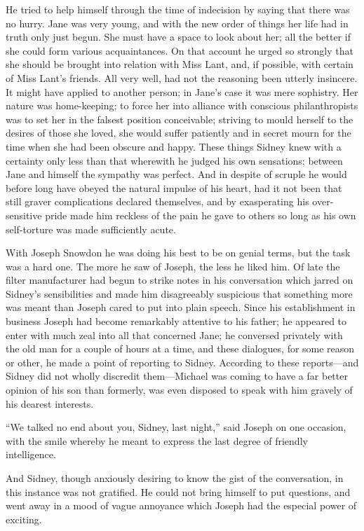He tried to help himself through the time of indecision by saying that
there was no hurry. Jane was very young, and with the new order of
things her life had in truth only just begun. She must have a space to
look about her; all the better if she could form various acquaintances.
On that account he urged so strongly that she should be brought into
relation with Miss Lant, and, if possible, with certain of Miss Lant's
friends. All very well, had not the reasoning been utterly insincere. It
might have applied to another person; in Jane's case it was mere
sophistry. Her nature was home-keeping; to force her into alliance with
conscious {}philanthropists was to set her in the falsest position
conceivable; striving to mould herself to the desires of those she
loved, she would suffer patiently and in secret mourn for the time when
she had been obscure and happy. These things Sidney knew with a
certainty only less than that wherewith he judged his own sensations;
between Jane and himself the sympathy was perfect. And in despite of
scruple he would before long have obeyed the natural impulse of his
heart, had it not been that still graver complications declared
themselves, and by exasperating his over-sensitive pride made him
reckless of the pain he gave to others so long as his own self-torture
was made sufficiently acute.

With Joseph Snowdon he was doing his best to be on genial terms, but the
task was a hard one. The more he saw of Joseph, the less he liked him.
Of late the filter manufacturer had begun to strike notes in his
conversation which jarred on Sidney's sensibilities and made him
disagreeably suspicious that something more was meant than Joseph
{}cared to put into plain speech. Since his establishment in business
Joseph had become remarkably attentive to his father; he appeared to
enter with much zeal into all that concerned Jane; he conversed
privately with the old man for a couple of hours at a time, and these
dialogues, for some reason or other, he made a point of reporting to
Sidney. According to these reports---and Sidney did not wholly discredit
them---Michael was coming to have a far better opinion of his son than
formerly, was even disposed to speak with him gravely of his dearest
interests.

``We talked no end about you, Sidney, last night,'' said Joseph on one
occasion, with the smile whereby he meant to express the last degree of
friendly intelligence.

And Sidney, though anxiously desiring to know the gist of the
conversation, in this instance was not gratified. He could not bring
himself to put questions, and went away in a mood of vague annoyance
which Joseph had the especial power of exciting.

